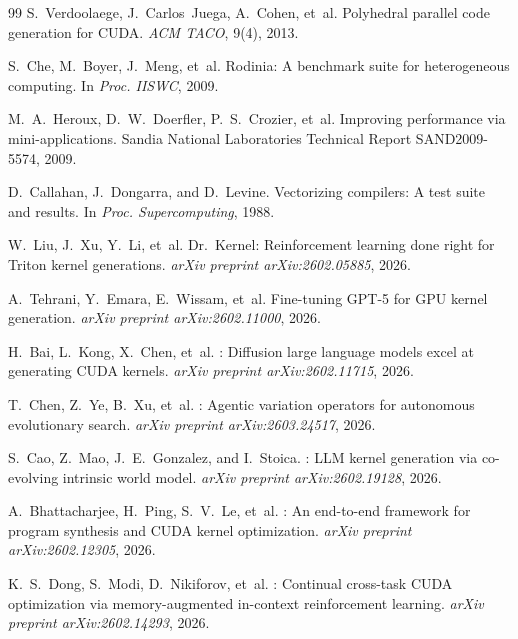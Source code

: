 \documentclass[sigconf]{acmart}
\begin{document}
\begin{thebibliography}{99}
S.~Verdoolaege, J.~Carlos~Juega, A.~Cohen, et~al.
\newblock Polyhedral parallel code generation for {CUDA}.
\newblock \emph{ACM TACO}, 9(4), 2013.

S.~Che, M.~Boyer, J.~Meng, et~al.
\newblock Rodinia: A benchmark suite for heterogeneous computing.
\newblock In \emph{Proc. IISWC}, 2009.

M.~A.~Heroux, D.~W.~Doerfler, P.~S.~Crozier, et~al.
\newblock Improving performance via mini-applications.
\newblock Sandia National Laboratories Technical Report SAND2009-5574, 2009.

D.~Callahan, J.~Dongarra, and D.~Levine.
\newblock Vectorizing compilers: A test suite and results.
\newblock In \emph{Proc. Supercomputing}, 1988.

W.~Liu, J.~Xu, Y.~Li, et~al.
\newblock Dr.~Kernel: Reinforcement learning done right for {Triton} kernel generations.
\newblock \emph{arXiv preprint arXiv:2602.05885}, 2026.

A.~Tehrani, Y.~Emara, E.~Wissam, et~al.
\newblock Fine-tuning {GPT-5} for {GPU} kernel generation.
\newblock \emph{arXiv preprint arXiv:2602.11000}, 2026.

H.~Bai, L.~Kong, X.~Chen, et~al.
: Diffusion large language models excel at generating {CUDA} kernels.
\newblock \emph{arXiv preprint arXiv:2602.11715}, 2026.

T.~Chen, Z.~Ye, B.~Xu, et~al.
: Agentic variation operators for autonomous evolutionary search.
\newblock \emph{arXiv preprint arXiv:2603.24517}, 2026.

S.~Cao, Z.~Mao, J.~E.~Gonzalez, and I.~Stoica.
: {LLM} kernel generation via co-evolving intrinsic world model.
\newblock \emph{arXiv preprint arXiv:2602.19128}, 2026.

A.~Bhattacharjee, H.~Ping, S.~V.~Le, et~al.
: An end-to-end framework for program synthesis and {CUDA} kernel optimization.
\newblock \emph{arXiv preprint arXiv:2602.12305}, 2026.

K.~S.~Dong, S.~Modi, D.~Nikiforov, et~al.
: Continual cross-task {CUDA} optimization via memory-augmented in-context reinforcement learning.
\newblock \emph{arXiv preprint arXiv:2602.14293}, 2026.


\end{thebibliography}
\end{document}
